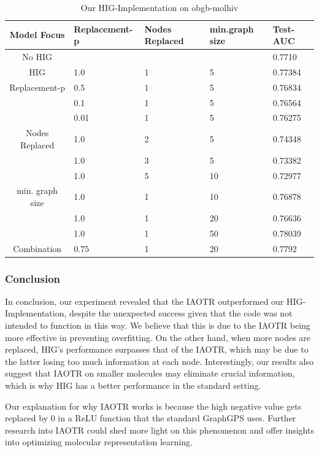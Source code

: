 \begin{table}[ht!]
    \centering
    \caption{Our HIG-Implementation on obgb-molhiv}
    \label{hig_results}
    \begin{tabular}{c || l|l|l|l|}
        Model Focus        & Replacement-p & Nodes Replaced & min.graph size & Test-AUC \\
        \hline
        \hline
        No HIG             &                 &                    &                & 0.7710   \\
        \hline
        HIG       & 1.0             & 1                  & 5              & 0.77384  \\
        \hline
        Replacement-p    & 0.5             & 1                  & 5              & 0.76834  \\
                           & 0.1             & 1                  & 5              & 0.76564  \\
                           & 0.01            & 1                  & 5              & 0.76275   \\
        \hline
        Nodes Replaced & 1.0             & 2                  & 5              & 0.74348  \\
                           & 1.0             & 3                  & 5              & 0.73382  \\
                           & 1.0             & 5                  & 10             & 0.72977  \\
        \hline
        min. graph size    & 1.0             & 1                  & 10             & 0.76878  \\
                           & 1.0             & 1                  & 20             & 0.76636  \\
                           & 1.0             & 1                  & 50             & 0.78039   \\
        \hline
        Combination        & 0.75            & 1                  & 20             & 0.7792  \\
    \end{tabular}
\end{table}

\subsubsection{Conclusion}
In conclusion, our experiment revealed that the IAOTR outperformed our HIG-Implementation, despite the unexpected success given that the code was not intended to function in this way. We believe that this is due to the IAOTR  being more effective in preventing overfitting. On the other hand, when more nodes are replaced, HIG's performance surpasses that of the IAOTR, which may be due to the latter losing too much information at each node. Interestingly, our results also suggest that IAOTR on smaller molecules may eliminate crucial information, which is why HIG has a better performance in the standard setting. 

Our explanation for why IAOTR works is because the high negative value gets replaced by 0 in a ReLU function that the standard GraphGPS \cite{2023graphgps} uses.
Further research into IAOTR could shed more light on this phenomenon and offer insights into optimizing molecular representation learning.
